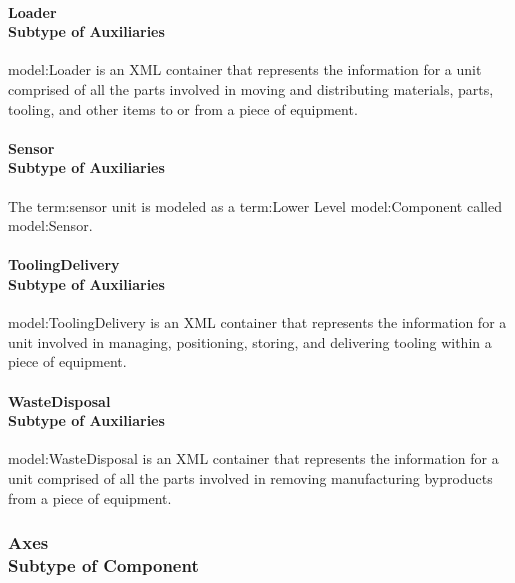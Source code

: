 \paragraph[Loader]{Loader \\ {\small Subtype of Auxiliaries}}\mbox{}
  \label{type:Loader}

\FloatBarrier

{model:Loader} is an XML container that represents the information for a unit comprised of all the parts involved in moving and distributing materials, parts, tooling, and other items to or from a piece of equipment.

\paragraph[Sensor]{Sensor \\ {\small Subtype of Auxiliaries}}\mbox{}
  \label{type:Sensor}

\FloatBarrier

The {term:sensor unit} is modeled as a {term:Lower Level} {model:Component} called {model:Sensor}.

\paragraph[ToolingDelivery]{ToolingDelivery \\ {\small Subtype of Auxiliaries}}\mbox{}
  \label{type:ToolingDelivery}

\FloatBarrier

{model:ToolingDelivery} is an XML container that represents the information for a unit involved in managing, positioning, storing, and delivering tooling within a piece of equipment.


\paragraph[WasteDisposal]{WasteDisposal \\ {\small Subtype of Auxiliaries}}\mbox{}
  \label{type:WasteDisposal}

\FloatBarrier

{model:WasteDisposal} is an XML container that represents the information for a unit comprised of all the parts involved in removing manufacturing byproducts from a piece of equipment.


\FloatBarrier
\subsubsection[Axes]{Axes \\ {\small Subtype of Component}}
  \label{type:Axes}

